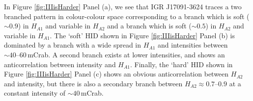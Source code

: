 \par In Figure \ref{fig:IIIisHarder} Panel (a), we see that IGR J17091-3624 traces a two branched pattern in colour-colour space corresponding to a branch which is soft ($\sim0.9$) in $H_{A1}$ and variable in $H_{A2}$ and a branch which is soft ($\sim0.5$) in $H_{A2}$ and variable in $H_{A1}$.  The `soft' HID shown in Figure \ref{fig:IIIisHarder} Panel (b) is dominated by a branch with a wide spread in $H_{A1}$ and intensities between $\sim40\mbox{--}60$\,mCrab.  A second branch exists at lower intensities, and shows an anticorrelation between intensity and $H_{A1}$.  Finally, the `hard' HID shown in Figure \ref{fig:IIIisHarder} Panel (c) shows an obvious anticorrelation between $H_{A2}$ and intensity, but there is also a secondary branch between $H_{A2}\approx 0.7\mbox{--}0.9$ at a constant intensity of $\sim40$\,mCrab.

